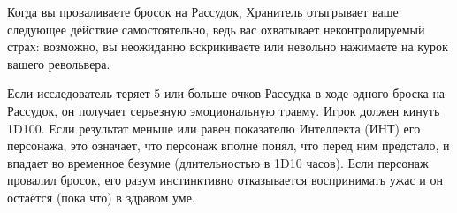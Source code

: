 \documentclass[letterpaper,twocolumn,openany, twoside, 11pt, usenames]{cocbook}
\newlength{\seplinewidth}
\newlength{\seplinesep}
\newcommand*{\sepline}{%
  \par
  \vspace{\dimexpr\seplinesep+.5\parskip}%
  \cleaders\vbox{%
    \begingroup %
      \color{sepline}%
      \hrule width\linewidth height\seplinewidth
    \endgroup
  }\vskip\seplinewidth
  \vspace{\dimexpr\seplinesep-.5\parskip}%
}
\begin{document}

Когда вы проваливаете бросок на Рассудок, Хранитель отыгрывает ваше следующее действие самостоятельно, ведь вас охватывает неконтролируемый страх: возможно, вы неожиданно вскрикиваете или невольно нажимаете на курок вашего револьвера.

Если исследователь теряет 5 или больше очков Рассудка в ходе одного броска на Рассудок, он получает серьезную эмоциональную травму. Игрок должен кинуть 1D100. Если результат меньше или равен показателю Интеллекта (ИНТ) его персонажа, это означает, что персонаж вполне понял, что перед ним предстало, и впадает во временное безумие (длительностью в  1D10 часов). Если персонаж провалил бросок, его разум инстинктивно отказывается воспринимать ужас и он остаётся (пока что) в здравом уме.
\end{document}
